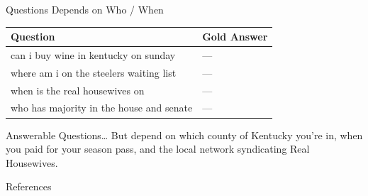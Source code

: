 \documentclass[xcolor=dvipsnames,xcolor=table]{beamer}
\begin{document}
\begin{frame}{Questions Depends on Who / When}
  \begin{tabular}{p{8cm}p{2cm}}
    \toprule
    Question & Gold Answer \\
    \hline
    can i buy wine in kentucky on sunday & --- \\
    where am i on the steelers waiting list & --- \\
    when is the real housewives on & --- \\
    who has majority in the house and senate & --- \\
    \bottomrule
  \end{tabular}  

  \pause

  \begin{block}{Answerable Questions\dots}
  But depend on which county of Kentucky you're in,
  when you paid for your season pass, and the local network
  syndicating Real Housewives.
  \end{block}
  
\end{frame}


\begin{frame}{References}

\tiny

\end{frame}
\end{document}

